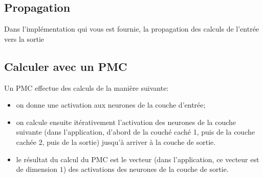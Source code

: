 \documentclass[a4paper]{article}
\begin{document}
\subsection{Propagation}

Dans l'implémentation qui vous est fournie, la propagation des calculs
de l'entrée vers la sortie 


\subsection{Calculer avec un PMC}

Un PMC effectue des calculs de la manière suivante:
\begin{itemize}
\item on donne une activation aux neurones de la couche d'entrée;
\item on calcule ensuite itérativement l'activation des neurones de la
  couche suivante (dans l'application, d'abord de la couché caché 1,
  puis de la couche cachée 2, puis de la sortie) jusqu'à arriver à la
  couche de sortie.
\item le résultat du calcul du PMC est le vecteur (dans l'application,
  ce vecteur est de dimension \(1\)) des activations des neurones de
  la couche de sortie.
\end{itemize}
\end{document}
